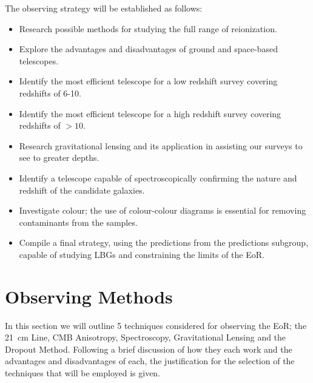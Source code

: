 	The observing strategy will be established as follows:
	\begin{itemize}
		\item Research possible methods for studying the full range of reionization.
		\item Explore the advantages and disadvantages of ground and space-based telescopes.
		\item Identify the most efficient telescope for a low redshift survey covering redshifts of 6-10.
		\item Identify the most efficient telescope for a high redshift survey covering redshifts of $>10$.
		\item Research gravitational lensing and its application in assisting our surveys to see to greater depths.
		\item Identify a telescope capable of spectroscopically confirming the nature and redshift of the candidate galaxies.
		\item Investigate colour; the use of colour-colour diagrams is essential for removing contaminants from the samples.
		\item Compile a final strategy, using the predictions from the predictions subgroup, capable of studying LBGs and constraining the limits of the EoR.
	\end{itemize}

\section{Observing Methods} %
\label{sec:observing_methods}
	In this section we will outline 5 techniques considered for observing the EoR; the \SI{21}{\centi\metre} Line, CMB Anisotropy, Spectroscopy, Gravitational Lensing and the Dropout Method. Following a brief discussion of how they each work and the advantages and disadvantages of each, the justification for the selection of the techniques that will be employed is given.
